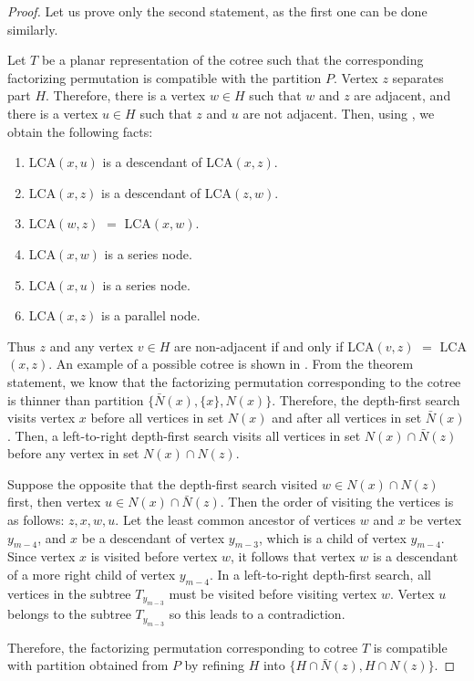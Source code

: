 \begin{proof}
Let us prove only the second statement, as the first one can be done similarly.

Let $T$ be a planar representation of the cotree such that the corresponding factorizing permutation is compatible with the partition $P$.  Vertex $z$ separates part $H$. Therefore, there is a vertex $w \in H$ such that $w$ and $z$ are adjacent, and there is a vertex $u \in H$ such that $z$ and $u$ are not adjacent. Then, using , we obtain the following facts:
\begin{enumerate}
    \item LCA$(x,u)$ is a descendant of LCA$(x,z)$.
    \item LCA$(x,z)$ is a descendant of LCA$(z,w)$.
    \item LCA$(w,z)$  $=$  LCA$(x,w)$.
    \item LCA$(x,w)$ is a series node.
    \item LCA$(x,u)$ is a series node.
    \item LCA$(x,z)$ is a parallel node.
\end{enumerate}
Thus $z$ and any vertex $v \in H$ are non-adjacent if and only if LCA$(v,z)$ $=$ LCA$(x,z)$. An example of a possible cotree is shown in . From the theorem statement, we know that the factorizing permutation corresponding to the cotree is thinner than partition $\{\bar{N}(x),\{x\} ,N(x) \}$. Therefore, the depth-first search visits vertex $x$ before all vertices in set $N(x)$ and after all vertices in set $\bar{N}(x)$.
Then, a left-to-right depth-first search visits all vertices in set $N(x) \cap \bar{N}(z)$ before any vertex in set $N(x) \cap N(z)$. 

Suppose the opposite that the depth-first search visited $w \in N(x) \cap N(z)$ first, then vertex $u \in N(x) \cap \bar{N}(z)$. Then the order of visiting the vertices is as follows: $z, x, w, u$. Let the least common ancestor of vertices $w$ and $x$ be vertex $y_{m-4}$, and $x$ be a descendant of vertex $y_{m-3}$, which is a child of vertex $y_{m-4}$. Since vertex $x$ is visited before vertex $w$, it follows that vertex 
$w$ is a descendant of a more right child of vertex $y_{m-4}$. 
In a left-to-right depth-first search, all vertices in the subtree $T_{y_{m-3}}$ must be visited before visiting vertex $w$. Vertex $u$ belongs to  the subtree $T_{y_{m-3}}$ so this leads to a contradiction.

Therefore, the factorizing permutation corresponding to cotree $T$ is compatible with partition obtained from $P$ by refining $H$ into $\{  H \cap \bar{N}(z), H \cap N(z) \}$.


\end{proof}

